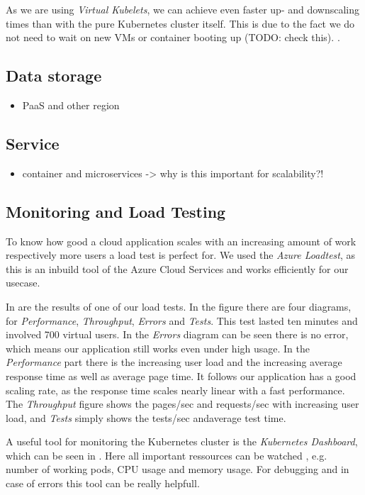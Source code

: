 \documentclass[conference]{IEEEtran}
\begin{document}
As we are using \textit{Virtual Kubelets}, we can achieve even faster up- and downscaling times
than with the pure Kubernetes cluster itself. This is due to the fact we do not need to wait on new VMs or container booting up (TODO: check this).
\cite{MicrosoftVirtualNode}.

\subsection{Data storage}
\begin{itemize}
	\item PaaS and other region
\end{itemize}

\subsection{Service}
\begin{itemize}
	\item container and microservices -> why is this important for scalability?!
\end{itemize}

\subsection{Monitoring and Load Testing}
To know how good a cloud application scales with an increasing amount of work respectively more users a load test is perfect for. We used the \textit{Azure Loadtest}, as this is an inbuild tool of the Azure Cloud Services and works efficiently for our usecase.

In  are the results of one of our load tests. In the figure there are four diagrams, for \textit{Performance}, \textit{Throughput}, \textit{Errors} and \textit{Tests}. This test lasted ten minutes and involved 700 virtual users. In the \textit{Errors} diagram can be seen there is no error, which means our application still works even under high usage. In the \textit{Performance} part there is the increasing user load and the increasing average response time as well as average page time. It follows our application has a good scaling rate, as the response time scales nearly linear with a fast performance. The \textit{Throughput} figure shows the pages/sec and requests/sec with increasing user load, and \textit{Tests} simply shows the tests/sec andaverage test time.

A useful tool for monitoring the Kubernetes cluster is the \textit{Kubernetes Dashboard}, which can be seen in . Here all important ressources can be watched , e.g. number of working pods, CPU usage and memory usage. For debugging and in case of errors this tool can be really helpfull.
\end{document}
